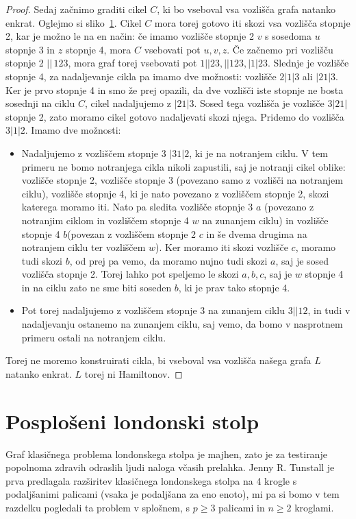 \documentclass[12pt,a4paper]{amsart}
\theoremstyle{definition} %
\theoremstyle{plain} %
\begin{document}
\begin{proof}
    Sedaj začnimo graditi cikel $C$, ki bo vseboval vsa vozlišča grafa natanko enkrat. Oglejmo si sliko~\ref{}.
    Cikel $C$ mora torej gotovo iti skozi vsa vozlišča stopnje 2, kar je možno le na en način: če imamo vozlišče stopnje 2 $v$ s sosedoma $u$ stopnje 3 in $z$ stopnje 4, mora $C$ vsebovati pot $u,v,z$.
    Če začnemo pri vozlišču stopnje 2 $||\,123$, mora graf torej vsebovati pot $1||23, ||123, |1|23$. Slednje je vozlišče stopnje 4, za nadaljevanje cikla pa imamo dve možnosti: vozlišče $2|1|3$ ali $|21|3$. Ker je prvo stopnje 4 in smo že prej opazili, da dve vozlišči iste stopnje ne bosta sosednji na ciklu $C$, cikel nadaljujemo z $|21|3$. Sosed tega vozlišča je vozlišče $3|21|$ stopnje 2, zato moramo cikel gotovo nadaljevati skozi njega. Pridemo do vozlišča $3|1|2$. Imamo dve možnosti: 
    \begin{itemize}[label={-}]
        \item Nadaljujemo z vozliščem stopnje 3 $|31|2$, ki je na notranjem ciklu. V tem primeru ne bomo notranjega cikla nikoli zapustili, saj je notranji cikel oblike: vozlišče stopnje 2, vozlišče stopnje 3 (povezano samo z vozlišči na notranjem ciklu), vozlišče stopnje 4, ki je nato povezano z vozliščem stopnje 2, skozi katerega moramo iti. Nato pa sledita vozlišče stopnje 3 $a$ (povezano z notranjim ciklom in vozliščem stopnje 4 $w$ na zunanjem ciklu) in vozlišče stopnje 4 $b$(povezan z vozliščem stopnje 2 $c$ in še dvema drugima na notranjem ciklu ter vozliščem $w$). Ker moramo iti skozi vozlišče $c$, moramo tudi skozi $b$, od prej pa vemo, da moramo nujno tudi skozi $a$, saj je sosed vozlišča stopnje 2. Torej lahko pot speljemo le skozi $a,b,c$, saj je $w$ stopnje 4 in na ciklu zato ne sme biti soseden $b$, ki je prav tako stopnje 4.
        \item Pot torej nadaljujemo z vozliščem stopnje 3 na zunanjem ciklu $3||12$, in tudi v nadaljevanju ostanemo na zunanjem ciklu, saj vemo, da bomo v nasprotnem primeru ostali na notranjem ciklu.
    \end{itemize}
    Torej ne moremo konstruirati cikla, bi vseboval vsa vozlišča našega grafa $L$ natanko enkrat. $L$ torej ni Hamiltonov.
    \qedhere
\end{proof}

\section{Posplošeni londonski stolp}
Graf klasičnega problema londonskega stolpa je majhen, zato je za testiranje popolnoma zdravih odraslih ljudi naloga včasih prelahka. Jenny R. Tunstall je prva
predlagala razširitev klasičnega londonskega stolpa na 4 krogle s podaljšanimi palicami (vsaka je podaljšana
za eno enoto), mi pa si bomo v tem razdelku pogledali ta problem v splošnem, s $p \geq 3$ palicami in $n \geq 2$ kroglami.
\end{document}
